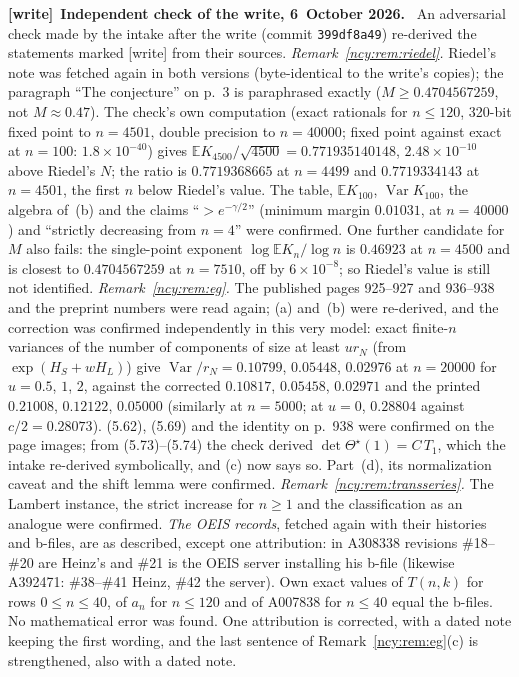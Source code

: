 \documentclass[11pt,letterpaper]{article}
\numberwithin{equation}{section}
\theoremstyle{remark}\newtheorem{remark}[theorem]{Remark}
\newcommand{\EE}{\mathbb E}
\newcommand{\Var}{\operatorname{Var}}
\newcommand{\file}[1]{\nolinkurl{#1}}
\newenvironment{writenote}[1][]{\par\smallskip\begingroup\small
 \noindent\textbf{[write]}\if\relax\detokenize{#1}\relax\else~\textbf{#1.}\fi\ }%
 {\par\endgroup\smallskip}
\theoremstyle{definition}\newtheorem{definition}[theorem]{Definition}\theoremstyle{plain}
\begin{document}
\begin{writenote}[Independent check of the write, 6~October 2026]
An adversarial check made by the intake after the write (commit
\file{399df8a49}) re-derived the statements marked [write] from their sources.
\emph{Remark~\ref{ncy:rem:riedel}.} Riedel's note was fetched again in both
versions (byte-identical to the write's copies); the paragraph ``The
conjecture'' on p.~3 is paraphrased exactly ($M\ge0.4704567259$, not
$M\approx0.47$). The check's own computation (exact rationals for $n\le120$, 320-bit
fixed point to $n=4501$, double precision to $n=40000$; fixed point against
exact at $n=100$: $1.8\times10^{-40}$) gives
$\EE K_{4500}/\sqrt{4500}=0.771935140148$, $2.48\times10^{-10}$ above Riedel's
$N$; the ratio is $0.7719368665$ at $n=4499$ and $0.7719334143$ at $n=4501$,
the first $n$ below Riedel's value. The table, $\EE K_{100}$, $\Var K_{100}$,
the algebra of~(b) and the claims ``$>e^{-\gamma/2}$'' (minimum margin
$0.01031$, at $n=40000$) and ``strictly decreasing from $n=4$'' were
confirmed. One further candidate for~$M$ also fails: the single-point
exponent $\log\EE K_n/\log n$ is $0.46923$ at $n=4500$ and is closest to
$0.4704567259$ at $n=7510$, off by $6\times10^{-8}$; so Riedel's value is
still not identified. \emph{Remark~\ref{ncy:rem:eg}.} The published pages
925--927 and 936--938 and the preprint numbers were read again;
(a) and~(b) were re-derived, and the correction was confirmed independently
in this very model: exact finite-$n$ variances of the number of components of
size at least $ur_N$ (from $\exp(H_S+wH_L)$) give $\Var/r_N=0.10799$,
$0.05448$, $0.02976$ at $n=20000$ for $u=0.5$, $1$, $2$, against the
corrected $0.10817$, $0.05458$, $0.02971$ and the printed $0.21008$,
$0.12122$, $0.05000$ (similarly at $n=5000$; at $u=0$, $0.28804$ against
$c/2=0.28073$). (5.62), (5.69) and the identity on p.~938 were confirmed on
the page images; from (5.73)--(5.74) the check derived
$\det\Theta^\star(1)=C\,T_1$, which the intake re-derived symbolically, and
(c) now says so. Part~(d), its normalization caveat and the shift lemma were
confirmed. \emph{Remark~\ref{ncy:rem:transseries}.} The Lambert instance, the
strict increase for $n\ge1$ and the classification as an analogue were
confirmed. \emph{The OEIS records}, fetched again with their histories and
b-files, are as described, except one attribution: in A308338 revisions
\#18--\#20 are Heinz's and \#21 is the OEIS server installing his b-file
(likewise A392471: \#38--\#41 Heinz, \#42 the server). Own exact values of
$T(n,k)$ for rows $0\le n\le40$, of $a_n$ for $n\le120$ and of A007838 for
$n\le40$ equal the b-files. No mathematical error was found. One attribution
is corrected, with a dated note keeping the first wording, and the last
sentence of Remark~\ref{ncy:rem:eg}(c) is strengthened, also with a dated
note.
\end{writenote}
\end{document}
